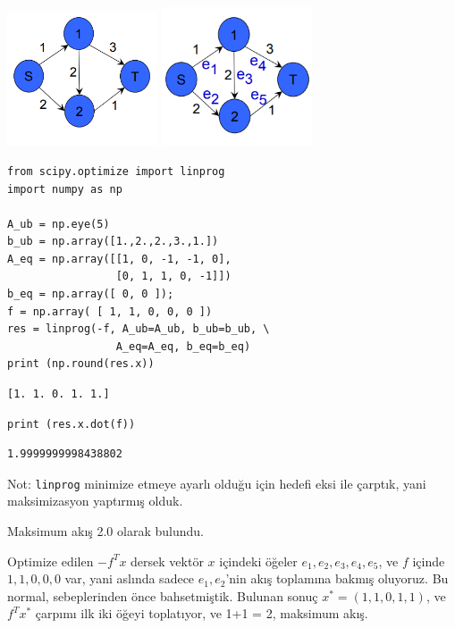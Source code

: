 \documentclass[12pt,fleqn]{article}\usepackage{../../common}
\begin{document}
\includegraphics[width=12em]{func_55_duality_04.png}
\includegraphics[width=12em]{func_55_duality_05.png}

\begin{verbatim}
from scipy.optimize import linprog
import numpy as np

A_ub = np.eye(5)
b_ub = np.array([1.,2.,2.,3.,1.])
A_eq = np.array([[1, 0, -1, -1, 0],
                 [0, 1, 1, 0, -1]])
b_eq = np.array([ 0, 0 ]);
f = np.array( [ 1, 1, 0, 0, 0 ])
res = linprog(-f, A_ub=A_ub, b_ub=b_ub, \
                 A_eq=A_eq, b_eq=b_eq)
print (np.round(res.x))
\end{verbatim}

\begin{verbatim}
[1. 1. 0. 1. 1.]
\end{verbatim}

\begin{verbatim}
print (res.x.dot(f))
\end{verbatim}

\begin{verbatim}
1.9999999998438802
\end{verbatim}

Not: \verb!linprog! minimize etmeye ayarlı olduğu için hedefi eksi ile
çarptık, yani maksimizasyon yaptırmış olduk.

Maksimum akış 2.0 olarak bulundu. 

Optimize edilen $-f^T x$ dersek vektör $x$ içindeki öğeler
$e_1,e_2,e_3,e_4,e_5$, ve $f$ içinde $1,1,0,0,0$ var, yani aslında sadece
$e_1,e_2$'nin akış toplamına bakmış oluyoruz. Bu normal, sebeplerinden önce
bahsetmiştik. Bulunan sonuç $x^* = (1,1,0,1,1)$, ve $f^Tx^*$ çarpımı ilk
iki öğeyi toplatıyor, ve 1+1 = 2, maksimum akış.
\end{document}
